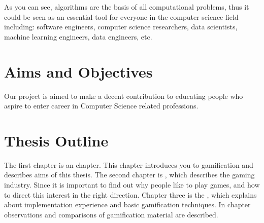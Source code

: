 As you can see, algorithms are the basis of all computational problems, thus it could be seen as an essential tool for everyone in the computer science field including: software engineers, computer science researchers, data scientists, machine learning engineers, data engineers, etc.


\section{Aims and Objectives}
Our project is aimed to make a decent contribution to educating people who aspire to enter career in Computer Science related professions.

\section{Thesis Outline}
The first chapter is an \textit{} chapter. This chapter introduces you to gamification and describes aims of this thesis. The second chapter is \textit{}, which describes the gaming industry. Since it is important to find out why people like to play games, and how to direct this interest in the right direction. Chapter three is the \textit{}, which explains about implementation experience and basic gamification techniques. In chapter \textit{} observations and comparisons of gamification material are described.
